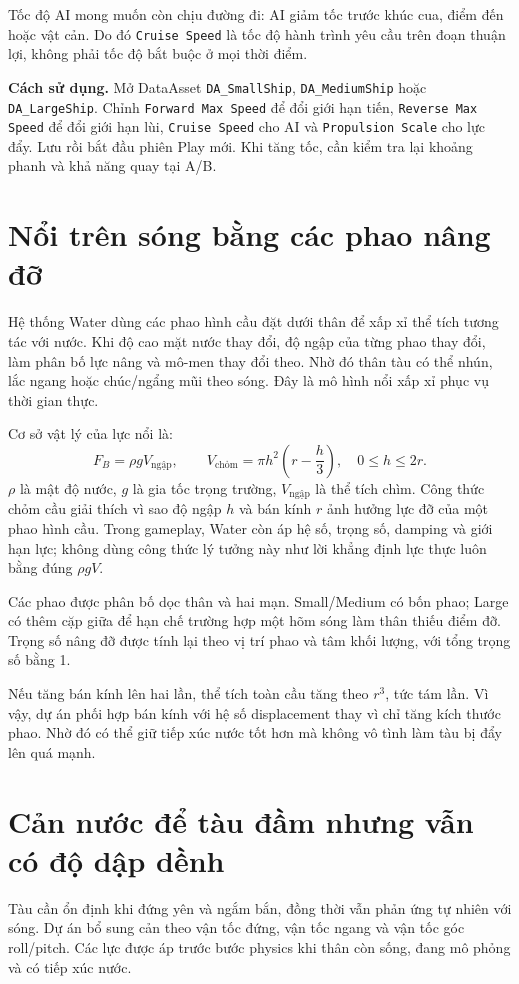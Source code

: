 \documentclass[11pt,a4paper,oneside]{report}
\newcommand{\howto}[1]{\par\smallskip\noindent\textbf{Cách sử dụng.} #1\par}
\begin{document}
Tốc độ AI mong muốn còn chịu đường đi: AI giảm tốc trước khúc cua, điểm đến hoặc vật cản. Do đó \texttt{Cruise Speed} là tốc độ hành trình yêu cầu trên đoạn thuận lợi, không phải tốc độ bắt buộc ở mọi thời điểm.
\howto{Mở DataAsset \texttt{DA\_SmallShip}, \texttt{DA\_MediumShip} hoặc \texttt{DA\_LargeShip}. Chỉnh \texttt{Forward Max Speed} để đổi giới hạn tiến, \texttt{Reverse Max Speed} để đổi giới hạn lùi, \texttt{Cruise Speed} cho AI và \texttt{Propulsion Scale} cho lực đẩy. Lưu rồi bắt đầu phiên Play mới. Khi tăng tốc, cần kiểm tra lại khoảng phanh và khả năng quay tại A/B.}

\section{Nổi trên sóng bằng các phao nâng đỡ}
Hệ thống Water dùng các phao hình cầu đặt dưới thân để xấp xỉ thể tích tương tác với nước. Khi độ cao mặt nước thay đổi, độ ngập của từng phao thay đổi, làm phân bố lực nâng và mô-men thay đổi theo. Nhờ đó thân tàu có thể nhún, lắc ngang hoặc chúc/ngẩng mũi theo sóng. Đây là mô hình nổi xấp xỉ phục vụ thời gian thực.\cite{water}

Cơ sở vật lý của lực nổi là:
\begin{equation}
 F_B=\rho gV_{\text{ngập}},\qquad
 V_{\text{chỏm}}=\pi h^2\left(r-\frac h3\right),\quad 0\leq h\leq2r.
\end{equation}
$\rho$ là mật độ nước, $g$ là gia tốc trọng trường, $V_{\text{ngập}}$ là thể tích chìm. Công thức chỏm cầu giải thích vì sao độ ngập $h$ và bán kính $r$ ảnh hưởng lực đỡ của một phao hình cầu. Trong gameplay, Water còn áp hệ số, trọng số, damping và giới hạn lực; không dùng công thức lý tưởng này như lời khẳng định lực thực luôn bằng đúng $\rho gV$.

Các phao được phân bố dọc thân và hai mạn. Small/Medium có bốn phao; Large có thêm cặp giữa để hạn chế trường hợp một hõm sóng làm thân thiếu điểm đỡ. Trọng số nâng đỡ được tính lại theo vị trí phao và tâm khối lượng, với tổng trọng số bằng 1.

Nếu tăng bán kính lên hai lần, thể tích toàn cầu tăng theo $r^3$, tức tám lần. Vì vậy, dự án phối hợp bán kính với hệ số displacement thay vì chỉ tăng kích thước phao. Nhờ đó có thể giữ tiếp xúc nước tốt hơn mà không vô tình làm tàu bị đẩy lên quá mạnh.

\section{Cản nước để tàu đầm nhưng vẫn có độ dập dềnh}
Tàu cần ổn định khi đứng yên và ngắm bắn, đồng thời vẫn phản ứng tự nhiên với sóng. Dự án bổ sung cản theo vận tốc đứng, vận tốc ngang và vận tốc góc roll/pitch. Các lực được áp trước bước physics khi thân còn sống, đang mô phỏng và có tiếp xúc nước.
\end{document}
